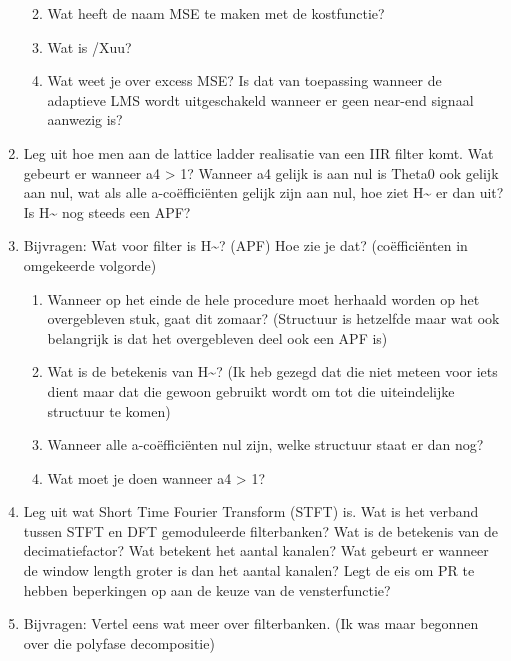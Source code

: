 \documentclass[
  a4paper,
  ,captions=tableheading
]{scrartcl}
\providecommand{\tightlist}{%
  \setlength{\itemsep}{0pt}\setlength{\parskip}{0pt}}
\begin{document}
\begin{enumerate}
  \begin{enumerate}
  \def\labelenumii{\arabic{enumii}.}
  \tightlist
  \item
    Wat heeft de naam MSE te maken met de kostfunctie?\\
  \item
    Wat is /Xuu?\\
  \item
    Wat weet je over excess MSE? Is dat van toepassing wanneer de
    adaptieve LMS wordt uitgeschakeld wanneer er geen near-end signaal
    aanwezig is?\\
  \end{enumerate}
\item
  Leg uit hoe men aan de lattice ladder realisatie van een IIR filter
  komt. Wat gebeurt er wanneer \textbar a4\textbar{} \textgreater{} 1?
  Wanneer a4 gelijk is aan nul is Theta0 ook gelijk aan nul, wat als
  alle a-coëfficiënten gelijk zijn aan nul, hoe ziet H\textasciitilde{}
  er dan uit? Is H\textasciitilde{} nog steeds een APF?\\
\item
  Bijvragen: Wat voor filter is H\textasciitilde? (APF) Hoe zie je dat?
  (coëfficiënten in omgekeerde volgorde)

  \begin{enumerate}
  \def\labelenumii{\arabic{enumii}.}
  \tightlist
  \item
    Wanneer op het einde de hele procedure moet herhaald worden op het
    overgebleven stuk, gaat dit zomaar? (Structuur is hetzelfde maar wat
    ook belangrijk is dat het overgebleven deel ook een APF is)\\
  \item
    Wat is de betekenis van H\textasciitilde? (Ik heb gezegd dat die
    niet meteen voor iets dient maar dat die gewoon gebruikt wordt om
    tot die uiteindelijke structuur te komen)\\
  \item
    Wanneer alle a-coëfficiënten nul zijn, welke structuur staat er dan
    nog?\\
  \item
    Wat moet je doen wanneer \textbar a4\textbar{} \textgreater{} 1?\\
  \end{enumerate}
\item
  Leg uit wat Short Time Fourier Transform (STFT) is. Wat is het verband
  tussen STFT en DFT gemoduleerde filterbanken? Wat is de betekenis van
  de decimatiefactor? Wat betekent het aantal kanalen? Wat gebeurt er
  wanneer de window length groter is dan het aantal kanalen? Legt de eis
  om PR te hebben beperkingen op aan de keuze van de vensterfunctie?\\
\item
  Bijvragen: Vertel eens wat meer over filterbanken. (Ik was maar
  begonnen over die polyfase decompositie)


\end{enumerate}
\end{document}
